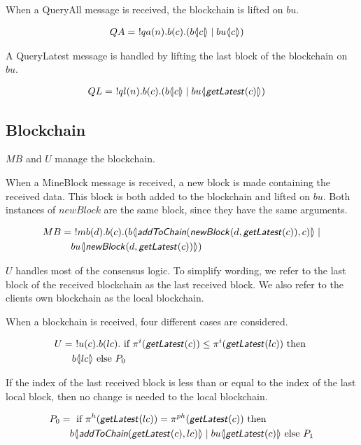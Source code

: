 When a QueryAll message is received, the blockchain is lifted on $bu$.

\begin{align*}
    QA &=\ !qa(n). b(c).(b \langle \! | c | \! \rangle \mid bu \langle \! | c | \! \rangle)
\end{align*}

A QueryLatest message is handled by lifting the last block of the blockchain on $bu$.

\begin{align*}
	QL &=\ !ql(n). b(c).(b \langle \! | c | \! \rangle \mid bu \langle \! | \text{\sffamily \textit{getLatest}\normalfont}(c) | \! \rangle)
\end{align*}

\subsection{Blockchain}

$MB$ and $U$ manage the blockchain.

When a MineBlock message is received, a new block is made containing the received data.
This block is both added to the blockchain and lifted on $bu$.
Both instances of $newBlock$ are the same block, since they have the same arguments.

\begin{align*}
    MB &=\ !mb(d). b(c).( b \langle \! | \text{\sffamily \textit{addToChain}\normalfont}(\text{\sffamily \textit{newBlock}\normalfont}(d,\text{\sffamily \textit{getLatest}\normalfont}(c)),c) | \! \rangle \mid \\
    &\quad bu \langle \! | \text{\sffamily \textit{newBlock}\normalfont}(d, \text{\sffamily \textit{getLatest}\normalfont}(c)) | \! \rangle)
\end{align*}

$U$ handles most of the consensus logic.
To simplify wording, we refer to the last block of the received blockchain as the last received block.
We also refer to the clients own blockchain as the local blockchain.

When a blockchain is received, four different cases are considered.

\begin{align*}
	U &=\ !u(c). b(lc). \text{ if }\pi^{i}( \text{\sffamily \textit{getLatest}\normalfont}(c)) \leq \pi^{i}(\text{\sffamily \textit{getLatest}\normalfont}(lc))\text{ then }\\
	&\quad b \langle \! | lc | \! \rangle\text{ else }P_0
\end{align*}

If the index of the last received block is less than or equal to the index of the last local block, then no change is needed to the local blockchain.

\begin{align*}
	P_0 &=\text{ if }\pi^{h}(\text{\sffamily \textit{getLatest}\normalfont}(lc))=\pi^{ph}(\text{\sffamily \textit{getLatest}\normalfont}(c))\text{ then }\\
	&\quad b \langle \! | \text{\sffamily \textit{addToChain}\normalfont}(\text{\sffamily \textit{getLatest}\normalfont}(c),lc) | \! \rangle \mid bu \langle \! | \text{\sffamily \textit{getLatest}\normalfont}(c) | \! \rangle\text{ else }P_1
\end{align*}

